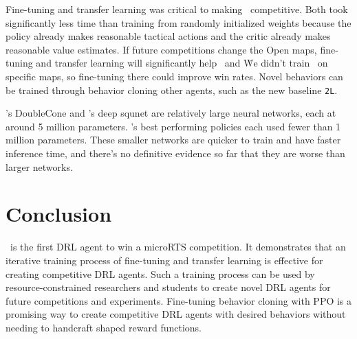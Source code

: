 \documentclass{article}
\begin{document}
Fine-tuning and transfer learning was critical to making \agentName\ competitive. Both
took significantly less time than training from randomly initialized weights because the
policy already makes reasonable tactical actions and the critic already makes
reasonable value estimates. If future competitions change the Open maps, fine-tuning and transfer learning
will significantly help \agentName\ and \bcPPOAgent\. We didn't train \bcPPOAgent\ on
specific maps, so fine-tuning there could improve win rates. Novel behaviors can be
trained through behavior cloning other agents, such as the new baseline \texttt{2L}.

\agentName's DoubleCone and \bcPPOAgent's deep squnet are relatively large neural
networks, each at around 5 million parameters.
\citet{DBLP:journals/corr/abs-2105-13807}'s best performing policies each used fewer
than 1 million parameters. These smaller networks are quicker to train and have faster
inference time, and there's no definitive evidence so far that they are worse than
larger networks.

\section{Conclusion}
\agentName\ is the first DRL agent to win a microRTS competition. It demonstrates that an
iterative training process of fine-tuning and transfer learning is effective for
creating competitive DRL agents. Such a training process can be used by 
resource-constrained researchers and students to create novel DRL agents for future 
competitions and experiments. Fine-tuning behavior cloning with PPO is a promising way
to create competitive DRL agents with desired behaviors without needing to handcraft
shaped reward functions.
\end{document}
